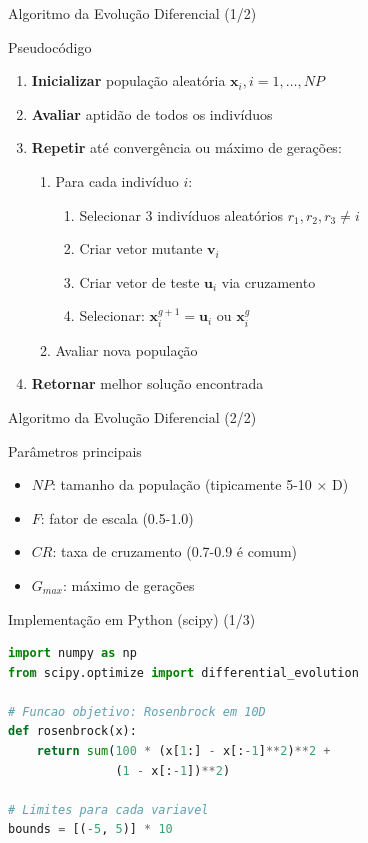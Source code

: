 \begin{frame}{Algoritmo da Evolução Diferencial (1/2)}
\begin{block}{Pseudocódigo}
\begin{enumerate}
    \item \textbf{Inicializar} população aleatória $\mathbf{x}_i, i = 1, \ldots, NP$
    \item \textbf{Avaliar} aptidão de todos os indivíduos
    \item \textbf{Repetir} até convergência ou máximo de gerações:
    \begin{enumerate}
        \item Para cada indivíduo $i$:
        \begin{enumerate}
            \item Selecionar 3 indivíduos aleatórios $r_1, r_2, r_3 \neq i$
            \item Criar vetor mutante $\mathbf{v}_i$
            \item Criar vetor de teste $\mathbf{u}_i$ via cruzamento
            \item Selecionar: $\mathbf{x}_i^{g+1} = \mathbf{u}_i$ ou $\mathbf{x}_i^g$
        \end{enumerate}
        \item Avaliar nova população
    \end{enumerate}
    \item \textbf{Retornar} melhor solução encontrada
\end{enumerate}
\end{block}
\end{frame}

\begin{frame}{Algoritmo da Evolução Diferencial (2/2)}
\begin{alertblock}{Parâmetros principais}
\begin{itemize}
    \item $NP$: tamanho da população (tipicamente 5-10 × D)
    \item $F$: fator de escala (0.5-1.0)
    \item $CR$: taxa de cruzamento (0.7-0.9 é comum)
    \item $G_{max}$: máximo de gerações
\end{itemize}
\end{alertblock}
\end{frame}

\begin{frame}[fragile]{Implementação em Python (scipy) (1/3)}
\begin{lstlisting}[language=Python, caption=Evolução Diferencial (Definição), basicstyle=\ttfamily\scriptsize]
import numpy as np
from scipy.optimize import differential_evolution

# Funcao objetivo: Rosenbrock em 10D
def rosenbrock(x):
    return sum(100 * (x[1:] - x[:-1]**2)**2 + 
               (1 - x[:-1])**2)

# Limites para cada variavel
bounds = [(-5, 5)] * 10
\end{lstlisting}
\end{frame}

